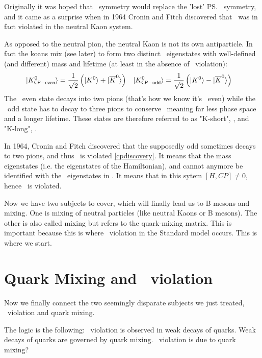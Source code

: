 Originally it was hoped that \cp\ symmetry would replace the 'lost'
 \ps\ symmetry, and it came as a surprise when in 1964 Cronin and Fitch
 discovered that \cp\ was in fact violated in the neutral Kaon
 system\cite{cpdiscovery}.

 As opposed to the neutral pion, the neutral Kaon is not its own
 antiparticle. In fact the koans mix (see later) to form two distinct
 \cp\ eigenstates with well-defined (and different) mass and lifetime (at least in the absence of \cp\ violation):
 \begin{align}
 \label{eq:KaonCPevenOdd}
   | K^0_{\mathsf{CP-even}} \rangle &= \frac{1}{\sqrt{2}}\left( | K^0 \rangle +  | \overline{K}^0 \rangle\right)
   &
   | K^0_{\mathsf{CP-odd}} \rangle &= \frac{1}{\sqrt{2}}\left( | K^0 \rangle -  | \overline{K}^0 \rangle  \right)
 \end{align}
 The \cp\ even state decays into two pions (that's how we know it's \cp\ even) while the \cp\ odd state has to decay to three pions to conserve \cp\, meaning far less phase space and a longer lifetime.
 These states are therefore referred to as "K-short", , 
 and "K-long", .

 In 1964, Cronin and Fitch discovered that the supposedly \cp\-odd
  sometimes decays to two pions, and thus \cp\ is violated
 \ref{cpdiscovery}. 
 It means that the mass eigenstates (i.e. the eigenstates of the Hamiltonian), 
  and  
 cannot anymore be identified with the \cp\ eigenstates in . 
 It means that in this sytem $[H,CP] \neq 0$, hence \cp\ is violated.

 Now we have two subjects to cover, which will finally lead us to B
 mesons and mixing. One is mixing of neutral particles (like neutral
 Kaons or B mesons). The other is also called mixing but refers to the
 quark-mixing matrix. This is important because this is where \cp\
 violation in the Standard model occurs. This is where we
 start.


\section{Quark Mixing and \cp\ violation}

 Now we finally connect the two seemingly disparate subjects we just
 treated, \cp\ violation and quark mixing.

 The logic is the following: \cp\ violation is observed in weak decays of
 quarks. Weak decays of quarks are governed by quark mixing. \cp\
 violation is due to quark mixing?

